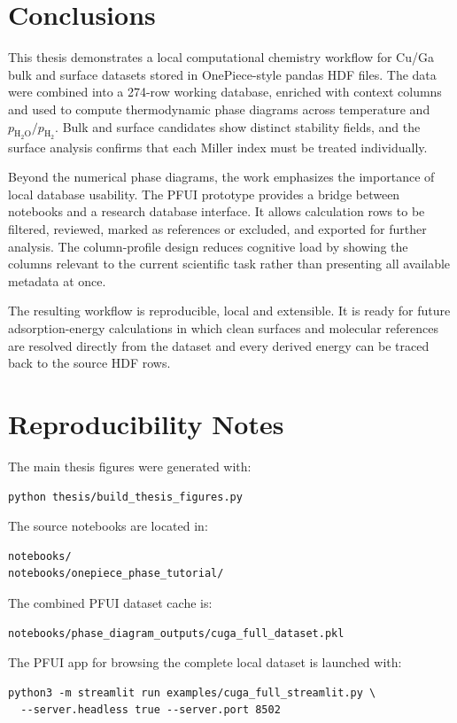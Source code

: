 \documentclass[12pt,a4paper,oneside]{report}
\begin{document}
\chapter{Conclusions}

This thesis demonstrates a local computational chemistry workflow for Cu/Ga
bulk and surface datasets stored in OnePiece-style pandas HDF files. The data
were combined into a 274-row working database, enriched with context columns and
used to compute thermodynamic phase diagrams across temperature and
$p_{\mathrm{H_2O}}/p_{\mathrm{H_2}}$. Bulk and surface candidates show distinct
stability fields, and the surface analysis confirms that each Miller index must
be treated individually.

Beyond the numerical phase diagrams, the work emphasizes the importance of
local database usability. The PFUI prototype provides a bridge between
notebooks and a research database interface. It allows calculation rows to be
filtered, reviewed, marked as references or excluded, and exported for further
analysis. The column-profile design reduces cognitive load by showing the
columns relevant to the current scientific task rather than presenting all
available metadata at once.

The resulting workflow is reproducible, local and extensible. It is ready for
future adsorption-energy calculations in which clean surfaces and molecular
references are resolved directly from the dataset and every derived energy can
be traced back to the source HDF rows.

\appendix

\chapter{Reproducibility Notes}

The main thesis figures were generated with:
\begin{verbatim}
python thesis/build_thesis_figures.py
\end{verbatim}

The source notebooks are located in:
\begin{verbatim}
notebooks/
notebooks/onepiece_phase_tutorial/
\end{verbatim}

The combined PFUI dataset cache is:
\begin{verbatim}
notebooks/phase_diagram_outputs/cuga_full_dataset.pkl
\end{verbatim}

The PFUI app for browsing the complete local dataset is launched with:
\begin{verbatim}
python3 -m streamlit run examples/cuga_full_streamlit.py \
  --server.headless true --server.port 8502
\end{verbatim}
\end{document}
